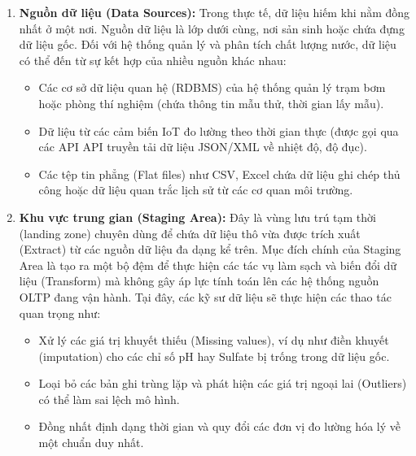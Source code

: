 \begin{enumerate}
    \item \textbf{Nguồn dữ liệu (Data Sources):} 
    Trong thực tế, dữ liệu hiếm khi nằm đồng nhất ở một nơi. Nguồn dữ liệu là lớp dưới cùng, nơi sản sinh hoặc chứa đựng dữ liệu gốc. Đối với hệ thống quản lý và phân tích chất lượng nước, dữ liệu có thể đến từ sự kết hợp của nhiều nguồn khác nhau:
    \begin{itemize}
        \item Các cơ sở dữ liệu quan hệ (RDBMS) của hệ thống quản lý trạm bơm hoặc phòng thí nghiệm (chứa thông tin mẫu thử, thời gian lấy mẫu).
        \item Dữ liệu từ các cảm biến IoT đo lường theo thời gian thực (được gọi qua các API API truyền tải dữ liệu JSON/XML về nhiệt độ, độ đục).
        \item Các tệp tin phẳng (Flat files) như CSV, Excel chứa dữ liệu ghi chép thủ công hoặc dữ liệu quan trắc lịch sử từ các cơ quan môi trường.
    \end{itemize}

    \item \textbf{Khu vực trung gian (Staging Area):} 
    Đây là vùng lưu trú tạm thời (landing zone) chuyên dùng để chứa dữ liệu thô vừa được trích xuất (Extract) từ các nguồn dữ liệu đa dạng kể trên. Mục đích chính của Staging Area là tạo ra một bộ đệm để thực hiện các tác vụ làm sạch và biến đổi dữ liệu (Transform) mà không gây áp lực tính toán lên các hệ thống nguồn OLTP đang vận hành. Tại đây, các kỹ sư dữ liệu sẽ thực hiện các thao tác quan trọng như:
    \begin{itemize}
        \item Xử lý các giá trị khuyết thiếu (Missing values), ví dụ như điền khuyết (imputation) cho các chỉ số pH hay Sulfate bị trống trong dữ liệu gốc.
        \item Loại bỏ các bản ghi trùng lặp và phát hiện các giá trị ngoại lai (Outliers) có thể làm sai lệch mô hình.
        \item Đồng nhất định dạng thời gian và quy đổi các đơn vị đo lường hóa lý về một chuẩn duy nhất.
    \end{itemize}


\end{enumerate}
